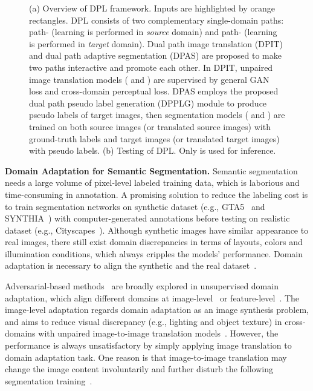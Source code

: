 \documentclass[10pt,twocolumn,letterpaper]{article}
\begin{document}
\begin{figure*}[t]
    \centering 
    \hspace{0.2cm}
\caption{(a) Overview of DPL framework. Inputs are highlighted by orange rectangles. DPL consists of two complementary single-domain paths: path- (learning is performed in \emph{source} domain) and path- (learning is performed in \emph{target} domain). Dual path image translation (DPIT) and dual path adaptive segmentation (DPAS) are proposed to make two paths interactive and promote each other. In DPIT, unpaired image translation models ( and ) are supervised by general GAN loss and cross-domain perceptual loss. DPAS employs the proposed dual path pseudo label generation (DPPLG) module to produce pseudo labels  of target images, then segmentation models ( and ) are trained on both source images (or translated source images) with ground-truth labels and target images (or translated target images) with pseudo labels. (b) Testing of DPL. Only  is used for inference.}
    \label{fig:DPL_flowchat}
    \vspace{-0.5cm}
\end{figure*}

{\noindent \textbf{Domain Adaptation for Semantic Segmentation.}}\hspace{3pt}
Semantic segmentation needs a large volume of pixel-level labeled training data, which is laborious and time-consuming in annotation. A promising solution to reduce the labeling cost is to train segmentation networks on synthetic dataset (e.g., GTA5~\cite{richter2016playing} and SYNTHIA~\cite{ros2016synthia}) with computer-generated annotations before testing on realistic dataset (e.g., Cityscapes~\cite{cordts2016cityscapes}). Although synthetic images have similar appearance to real images, there still exist domain discrepancies in terms of layouts, colors and illumination conditions, which always cripples the models' performance. Domain adaptation is necessary to align the synthetic and the real dataset~\cite{wu2018dcan,zou2018unsupervised,zhao2019madan,kang2020pixel}. 

Adversarial-based methods~\cite{hoffman2016fcns, long2018transferable,tsai2018learning} are broadly explored in unsupervised domain adaptation, which align different domains at image-level~\cite{murez2018image,hoffman2018cycada,wu2018dcan} or feature-level~\cite{tsai2018learning,huang2020contextual}. The image-level adaptation regards domain adaptation as an image synthesis problem, and aims to reduce visual discrepancy (e.g., lighting and object texture) in cross-domains with unpaired image-to-image translation models~\cite{CycleGAN2017,liu2017unsupervised,park2020contrastive}. However, the performance is always unsatisfactory by simply applying image translation to domain adaptation task. One reason is that image-to-image translation may change the image content involuntarily and further disturb the following segmentation training~\cite{li2019bidirectional}.
\end{document}
